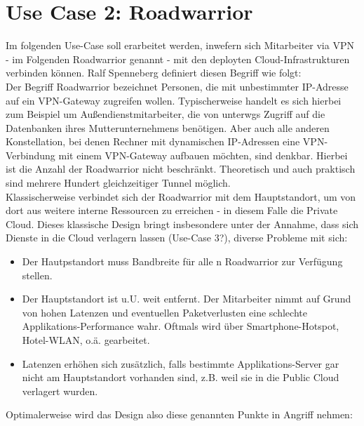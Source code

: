 \section{Use Case 2: Roadwarrior}
Im folgenden Use-Case soll erarbeitet werden, inwefern sich Mitarbeiter via VPN - im Folgenden Roadwarrior genannt - mit den deployten Cloud-Infrastrukturen verbinden können. Ralf Spenneberg definiert diesen Begriff wie folgt:\\
\glqq Der Begriff Roadwarrior bezeichnet Personen, die mit unbestimmter IP-Adresse auf ein VPN-Gateway zugreifen wollen. Typischerweise handelt es sich hierbei zum Beispiel um Außendienstmitarbeiter, die von unterwgs Zugriff auf die Datenbanken ihres Mutterunternehmens benötigen. Aber auch alle anderen Konstellation, bei denen Rechner mit dynamischen IP-Adressen eine VPN-Verbindung mit einem VPN-Gateway aufbauen möchten, sind denkbar. Hierbei ist die Anzahl der Roadwarrior nicht beschränkt. Theoretisch und auch praktisch sind mehrere Hundert gleichzeitiger Tunnel möglich.\grqq{} \cite[S. 199]{Spenneberg2010}\\
Klassischerweise verbindet sich der Roadwarrior mit dem Hauptstandort, um von dort aus weitere interne Ressourcen zu erreichen - in diesem Falle die Private Cloud. Dieses klassische Design bringt insbesondere unter der Annahme, dass sich Dienste in die Cloud verlagern lassen (Use-Case 3?), diverse Probleme mit sich:

\begin{itemize}
\item Der Hautpstandort muss Bandbreite für alle n Roadwarrior zur Verfügung stellen.
\item Der Hauptstandort ist u.U. weit entfernt. Der Mitarbeiter nimmt auf Grund von hohen Latenzen und eventuellen Paketverlusten eine schlechte Applikations-Performance wahr. Oftmals wird über Smartphone-Hotspot, Hotel-WLAN, o.ä. gearbeitet. 
\item Latenzen erhöhen sich zusätzlich, falls bestimmte Applikations-Server gar nicht am Hauptstandort vorhanden sind, z.B. weil sie in die Public Cloud verlagert wurden.
\end{itemize}

Optimalerweise wird das Design also diese genannten Punkte in Angriff nehmen:\\

